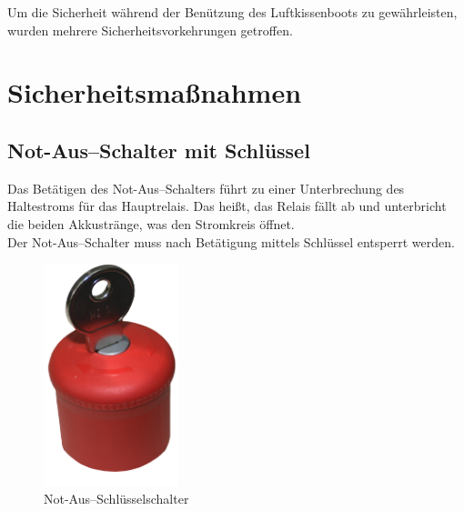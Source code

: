 Um die Sicherheit während der Benützung des Luftkissenboots zu gewährleisten, wurden mehrere Sicherheitsvorkehrungen getroffen. 
\section{Sicherheitsmaßnahmen}
\subsection{Not-Aus--Schalter mit Schlüssel}
Das Betätigen des Not-Aus--Schalters führt zu einer Unterbrechung des Haltestroms für das Hauptrelais. Das heißt, das Relais fällt ab und unterbricht die beiden Akkustränge, was den Stromkreis öffnet.\\
Der Not-Aus--Schalter muss nach Betätigung mittels Schlüssel entsperrt werden.
\begin{figure}[h]
    \centering
    \includegraphics[width=0.35\textwidth]{Fotos/Notaus.png}
    \caption{Not-Aus--Schlüsselschalter}    
\end{figure}

\clearpage
